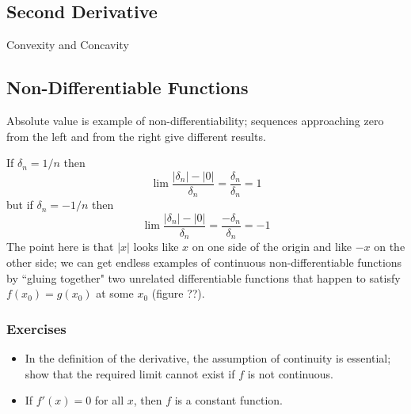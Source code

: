 \subsection{Second Derivative}
{\color{red}Convexity and Concavity}


\subsection{Non-Differentiable Functions}
{\color{red}Absolute value is example of non-differentiability; sequences approaching zero from the left and from the right give different results.} %

If $\delta_n = 1/n$ then
\[
\lim \frac{|\delta_n| - |0|}{\delta_n} = \frac{\delta_n}{\delta_n} = 1
\]
but if $\delta_n = -1/n$ then
\[
\lim\frac{|\delta_n| - |0|}{\delta_n} = \frac{-\delta_n}{\delta_n} = -1
\]
The point here is that $|x|$ looks like $x$ on one side of the origin and like $-x$ on the other side; we can get endless examples of continuous non-differentiable functions by ``gluing together" two unrelated differentiable functions that happen to satisfy $f(x_0)=g(x_0)$ at some $x_0$ (figure ??).


\subsubsection{Exercises}
\begin{itemize}
\item In the definition of the derivative, the assumption of continuity is essential; show that the required limit cannot exist if $f$ is not continuous.
\item If $f'(x)=0$ for all $x$, then $f$ is a constant function.
\end{itemize}

